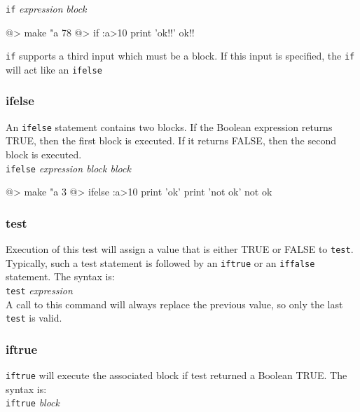 {\tt if} {\it expression} {\it block}\\ 
 
\begin{verbatimtab}
@> make "a 78
@> if :a>10 {print 'ok!!'} 
ok!!
\end{verbatimtab} 
 
{\tt if} supports a third input which must be a block. If this input is specified, the {\tt if} will 
act like an {\tt ifelse} 
 
\subsubsection*{ifelse} 
 
An \verb+ifelse+ statement contains two blocks.  If the Boolean expression returns
TRUE, then the first block is executed.  If it returns FALSE, then the
second block is executed.\\ 
 
{\tt ifelse} {\it expression block block}\\ 
  
\begin{verbatimtab} 
@> make "a 3
@> ifelse :a>10 {print 'ok'} {print 'not ok'} 
not ok
\end{verbatimtab}
 
\subsubsection*{test} 
Execution of this test will assign a value that is either TRUE or
FALSE to {\tt test}.  Typically, such a test statement is followed by an {\tt iftrue} or an
{\tt iffalse} statement. The syntax is:\\ 
 
{\tt test} {\it expression}\\ 
 
A call to this command will always replace the previous value, so only the last {\tt test} 
is valid. 
 
\subsubsection*{iftrue} 
 
{\tt iftrue} will execute the associated block if test returned a
Boolean TRUE. The syntax is:\\ 
 
{\tt iftrue} {\it block}
 
